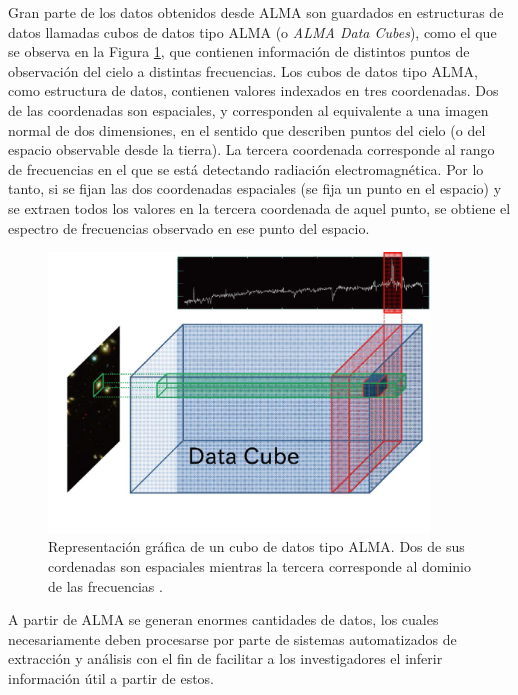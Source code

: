 Gran parte de los datos obtenidos desde ALMA son guardados en estructuras de datos llamadas cubos de datos tipo ALMA (o \textit{ALMA Data Cubes}), como el que se observa en la Figura \ref{fig:data_cube}, que contienen información de distintos puntos de observación del cielo a distintas frecuencias. Los cubos de datos tipo ALMA, como estructura de datos, contienen valores indexados en tres coordenadas. Dos de las coordenadas son espaciales, y corresponden al equivalente a una imagen normal de dos dimensiones, en el sentido que describen puntos del cielo (o del espacio observable desde la tierra). La tercera coordenada corresponde al rango de frecuencias en el que se está detectando radiación electromagnética. Por lo tanto, si se fijan las dos coordenadas espaciales (se fija un punto en el espacio) y se extraen todos los valores en la tercera coordenada de aquel punto, se obtiene el espectro de frecuencias observado en ese punto del espacio.

\begin{figure}[h!]
\begin{center}
\includegraphics[width=0.9\textwidth]{imagenes/data_cube.png}
\end{center}
\vspace*{-5mm}
\caption{Representación gráfica de un cubo de datos tipo ALMA. Dos de sus cordenadas son espaciales mientras la tercera corresponde al dominio de las frecuencias \cite{Eguchi:2013waa}.}
\label{fig:data_cube}
\end{figure}

A partir de ALMA se generan enormes cantidades de datos, los cuales necesariamente deben procesarse por parte de sistemas automatizados de extracción y análisis con el fin de facilitar a los investigadores el inferir información útil a partir de estos.

